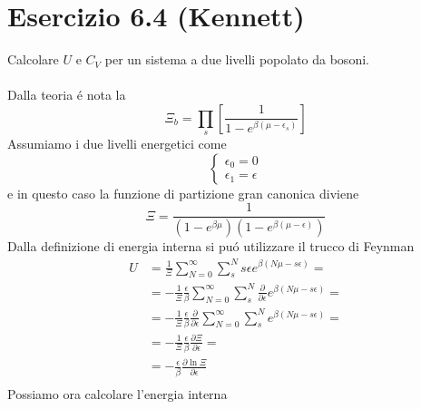 \documentclass[a4paper]{article}
\begin{document}
    \section*{Esercizio 6.4 (Kennett)}
        Calcolare $U$ e $C_V$ per un sistema a due livelli popolato da bosoni.
        \\
        \\
        Dalla teoria \'e nota la
        \begin{equation*}
            \Xi_b=\prod_s\left[\frac{1}{1-e^{\beta(\mu-\epsilon_s)}}\right]
        \end{equation*}
        Assumiamo i due livelli energetici come
        \begin{equation*}
            \begin{cases}
                \epsilon_0=0\\
                \epsilon_1=\epsilon
            \end{cases}
        \end{equation*}
        e in questo caso la funzione di partizione gran canonica diviene
        \begin{equation*}
            \Xi=\frac{1}{(1-e^{\beta\mu})(1-e^{\beta(\mu-\epsilon)})}
        \end{equation*}
        Dalla definizione di energia interna si pu\'o utilizzare il trucco di Feynman
        \begin{equation*}
            \begin{split}
                U&=\frac{1}{\Xi}\sum_{N=0}^\infty\sum_{s}^Ns\epsilon e^{\beta(N\mu-s\epsilon)}=\\
                &=-\frac{1}{\Xi}\frac{\epsilon}{\beta}\sum_{N=0}^\infty\sum_{s}^N\frac{\partial}{\partial\epsilon}e^{\beta(N\mu-s\epsilon)}=\\
                &=-\frac{1}{\Xi}\frac{\epsilon}{\beta}\frac{\partial}{\partial\epsilon}\sum_{N=0}^\infty\sum_{s}^Ne^{\beta(N\mu-s\epsilon)}=\\
                &=-\frac{1}{\Xi}\frac{\epsilon}{\beta}\frac{\partial\Xi}{\partial\epsilon}=\\
                &=-\frac{\epsilon}{\beta}\frac{\partial\ln\Xi}{\partial\epsilon}\\
            \end{split}
        \end{equation*}
        Possiamo ora calcolare l'energia interna
\end{document}
